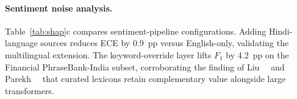 \paragraph{Sentiment noise analysis.}
Table~\ref{tab:shap}c compares sentiment-pipeline configurations. Adding
Hindi-language sources reduces ECE by 0.9~pp versus English-only, validating
the multilingual extension. The keyword-override layer lifts $F_1$ by 4.2~pp
on the Financial PhraseBank-India subset, corroborating the finding of
Liu~\etal~\cite{liu2024llms} and Parekh~\etal~\cite{parekh2022dlguess} that
curated lexicons retain complementary value alongside large transformers.

\begin{table}[t]
\centering
\caption{Explainability and temporal analysis results (RO3).}
\label{tab:shap}
\end{table}

